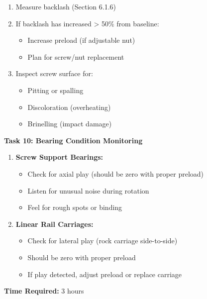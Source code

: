 \documentclass[
]{article}
\providecommand{\tightlist}{%
  \setlength{\itemsep}{0pt}\setlength{\parskip}{0pt}}
\begin{document}
\begin{enumerate}
\def\labelenumi{\arabic{enumi}.}
\tightlist
\item
  Measure backlash (Section 6.1.6)
\item
  If backlash has increased \textgreater{} 50\% from baseline:

  \begin{itemize}
  \tightlist
  \item
    Increase preload (if adjustable nut)
  \item
    Plan for screw/nut replacement
  \end{itemize}
\item
  Inspect screw surface for:

  \begin{itemize}
  \tightlist
  \item
    Pitting or spalling
  \item
    Discoloration (overheating)
  \item
    Brinelling (impact damage)
  \end{itemize}
\end{enumerate}

\textbf{Task 10: Bearing Condition Monitoring}

\begin{enumerate}
\def\labelenumi{\arabic{enumi}.}
\tightlist
\item
  \textbf{Screw Support Bearings:}

  \begin{itemize}
  \tightlist
  \item
    Check for axial play (should be zero with proper preload)
  \item
    Listen for unusual noise during rotation
  \item
    Feel for rough spots or binding
  \end{itemize}
\item
  \textbf{Linear Rail Carriages:}

  \begin{itemize}
  \tightlist
  \item
    Check for lateral play (rock carriage side-to-side)
  \item
    Should be zero with proper preload
  \item
    If play detected, adjust preload or replace carriage
  \end{itemize}
\end{enumerate}

\textbf{Time Required:} 3 hours
\end{document}

